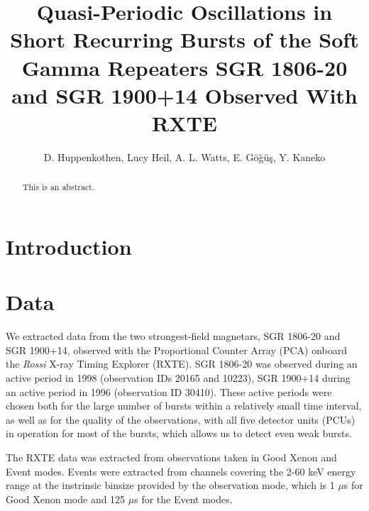 \documentclass[numberedappendix]{emulateapj}
\begin{document}
\title{Quasi-Periodic Oscillations in Short Recurring Bursts of the Soft Gamma Repeaters SGR 1806-20 and SGR 1900+14 Observed With RXTE}

\author{D. Huppenkothen, Lucy Heil, A. L. Watts,  E. G{\"o}{\u g}{\"u}{\c s}, Y. Kaneko}

 


\begin{abstract}
This is an abstract. 
\end{abstract}
\begin{abstract}
\end{abstract} 



\section{Introduction}

\section{Data}
\label{sec:data}

We extracted data from the two strongest-field magnetars, SGR 1806-20 and SGR 1900+14, observed with the Proportional Counter Array (PCA) onboard the {\it Rossi} X-ray Timing Explorer (RXTE). SGR 1806-20 was observed during an active period in 1998 (observation IDs 20165 and 10223), SGR 1900+14 during an active period in 1996 (observation ID 30410). These active periods were chosen both for the large number of bursts within a relatively small time interval, as well as for the quality of the observations, with all five detector units (PCUs) in operation for most of the bursts, which allows us to detect even weak bursts.

The RXTE data was extracted from observations taken in Good Xenon and Event modes. Events were extracted from channels covering the 2-60 keV energy range at the instrinsic binsize provided by the observation mode, which is 1 $\mu$s for Good Xenon mode and 125 $\mu$s for the Event modes.  
 
\end{document}
